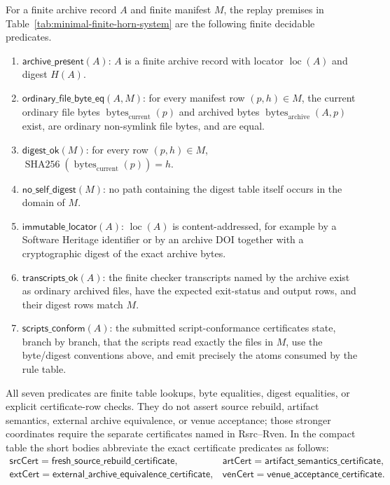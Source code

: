 \documentclass[runningheads]{llncs}
\newcommand{\archivepresent}{\mathsf{archive\_present}}
\newcommand{\ordinaryfilebyteeq}{\mathsf{ordinary\_file\_byte\_eq}}
\newcommand{\digestok}{\mathsf{digest\_ok}}
\newcommand{\noselfdigest}{\mathsf{no\_self\_digest}}
\newcommand{\immutablelocator}{\mathsf{immutable\_locator}}
\newcommand{\transcriptsok}{\mathsf{transcripts\_ok}}
\newcommand{\scriptsconform}{\mathsf{scripts\_conform}}
\newcommand{\freshsourcecertificate}{\mathsf{fresh\_source\_rebuild\_certificate}}
\newcommand{\artifactsemanticscertificate}{\mathsf{artifact\_semantics\_certificate}}
\newcommand{\externalarchivecertificate}{\mathsf{external\_archive\_equivalence\_certificate}}
\newcommand{\venueacceptancecertificate}{\mathsf{venue\_acceptance\_certificate}}
\newcommand{\RsrcCert}{\mathsf{srcCert}}
\newcommand{\RartCert}{\mathsf{artCert}}
\newcommand{\RextCert}{\mathsf{extCert}}
\newcommand{\RvenCert}{\mathsf{venCert}}
\begin{document}
\begin{definition}
\label{def:decidable-replay-premises-minimal}
For a finite archive record \(A\) and finite manifest \(M\), the replay premises
in Table~\ref{tab:minimal-finite-horn-system} are the following finite
decidable predicates.
\begin{enumerate}
\item \(\archivepresent(A)\): \(A\) is a finite archive record with locator
\(\operatorname{loc}(A)\) and digest \(H(A)\).
\item \(\ordinaryfilebyteeq(A,M)\): for every manifest row \((p,h)\in M\), the
current ordinary file bytes \(\operatorname{bytes}_{\mathrm{current}}(p)\) and
archived bytes \(\operatorname{bytes}_{\mathrm{archive}}(A,p)\) exist, are
ordinary non-symlink file bytes, and are equal.
\item \(\digestok(M)\): for every row \((p,h)\in M\),
\(\operatorname{SHA256}(\operatorname{bytes}_{\mathrm{current}}(p))=h\).
\item \(\noselfdigest(M)\): no path containing the digest table itself occurs in
the domain of \(M\).
\item \(\immutablelocator(A)\): \(\operatorname{loc}(A)\) is content-addressed,
for example by a Software Heritage identifier or by an archive DOI together with
a cryptographic digest of the exact archive bytes.
\item \(\transcriptsok(A)\): the finite checker transcripts named by the archive
exist as ordinary archived files, have the expected exit-status and output rows,
and their digest rows match \(M\).
\item \(\scriptsconform(A)\): the submitted script-conformance certificates
state, branch by branch, that the scripts read exactly the files in \(M\), use
the byte/digest conventions above, and emit precisely the atoms consumed by the
rule table.
\end{enumerate}
All seven predicates are finite table lookups, byte equalities, digest
equalities, or explicit certificate-row checks.  They do not assert source
rebuild, artifact semantics, external archive equivalence, or venue acceptance;
those stronger coordinates require the separate certificates named in
Rsrc--Rven.
In the compact table the short bodies abbreviate the exact certificate
predicates as follows:
\[
\begin{array}{ll}
\RsrcCert=\freshsourcecertificate,&
\RartCert=\artifactsemanticscertificate,\\
\RextCert=\externalarchivecertificate,&
\RvenCert=\venueacceptancecertificate.
\end{array}
\]
\end{definition}
\end{document}
